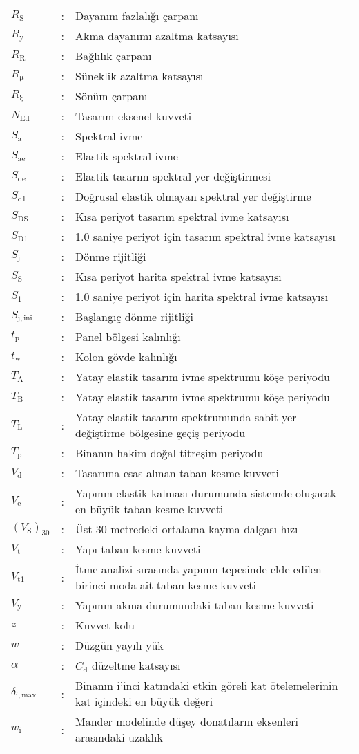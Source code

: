 \begin{longtable}[c]{>{\raggedright}p{1.5cm}l>{\raggedright}p{13.4cm}}
$R_{\mathrm{S}}$  & :  & Dayanım fazlalığı çarpanı\tabularnewline
$R_{\mathrm{y}}$  & :  & Akma dayanımı azaltma katsayısı\tabularnewline
$R_{\mathrm{R}}$  & :  & Bağlılık çarpanı\tabularnewline
$R_{\mathrm{\mu}}$  & :  & Süneklik azaltma katsayısı\tabularnewline
$R_{\mathrm{\xi}}$  & :  & Sönüm çarpanı\tabularnewline
$N_{\mathrm{Ed}}$  & :  & Tasarım eksenel kuvveti\tabularnewline
$S_{\mathrm{a}}$ & : & Spektral ivme\tabularnewline
$S_{\mathrm{ae}}$ & : & Elastik spektral ivme\tabularnewline
$S_{\mathrm{de}}$ & : & Elastik tasarım spektral yer değiştirmesi\tabularnewline
$S_{\mathrm{d1}}$ & : & Doğrusal elastik olmayan spektral yer değiştirme\tabularnewline
$S_{\mathrm{DS}}$ & : & Kısa periyot tasarım spektral ivme katsayısı\tabularnewline
$S_{\mathrm{D1}}$ & : & 1.0 saniye periyot için tasarım spektral ivme katsayısı\tabularnewline
$S_{\mathrm{j}}$ & : & Dönme rijitliği\tabularnewline
$S_{\mathrm{S}}$ & : & Kısa periyot harita spektral ivme katsayısı\tabularnewline
$S_{\mathrm{1}}$ & : & 1.0 saniye periyot için harita spektral ivme katsayısı\tabularnewline
$S_{\mathrm{j,ini}}$ & : & Başlangıç dönme rijitliği\tabularnewline
$t_{\mathrm{p}}$ & : & Panel bölgesi kalınlığı\tabularnewline
$t_{\mathrm{w}}$ & : & Kolon gövde kalınlığı\tabularnewline
$T_{\mathrm{A}}$  & :  & Yatay elastik tasarım ivme spektrumu köşe periyodu\tabularnewline
$T_{\mathrm{B}}$  & :  & Yatay elastik tasarım ivme spektrumu köşe periyodu\tabularnewline
$T_{\mathrm{L}}$  & :  & Yatay elastik tasarım spektrumunda sabit yer değiştirme bölgesine
geçiş periyodu\tabularnewline
$T_{\mathrm{p}}$  & :  & Binanın hakim doğal titreşim periyodu\tabularnewline
$V_{\mathrm{d}}$  & :  & Tasarıma esas alınan taban kesme kuvveti\tabularnewline
$V_{\mathrm{e}}$  & :  & Yapının elastik kalması durumunda sistemde oluşacak en büyük taban
kesme kuvveti\tabularnewline
$\left(V_{\mathrm{S}}\right)_{30}$ & :  & Üst 30 metredeki ortalama kayma dalgası hızı\tabularnewline
$V_{\mathrm{t}}$  & :  & Yapı taban kesme kuvveti \tabularnewline
$V_{\mathrm{t1}}$  & :  & İtme analizi sırasında yapının tepesinde elde edilen birinci moda
ait taban kesme kuvveti\tabularnewline
$V_{\mathrm{y}}$  & :  & Yapının akma durumundaki taban kesme kuvveti\tabularnewline
$z$  & :  & Kuvvet kolu\tabularnewline
$w$  & :  & Düzgün yayılı yük\tabularnewline
$\alpha$  & :  & $C_{\mathrm{d}}$ düzeltme katsayısı\tabularnewline
$\delta_{\mathrm{i,max}}$  & :  & Binanın i'inci katındaki etkin göreli kat ötelemelerinin kat içindeki
en büyük değeri\tabularnewline
$w_{\text{i}}$  & :  & Mander modelinde düşey donatıların eksenleri arasındaki uzaklık\tabularnewline

\end{longtable}
